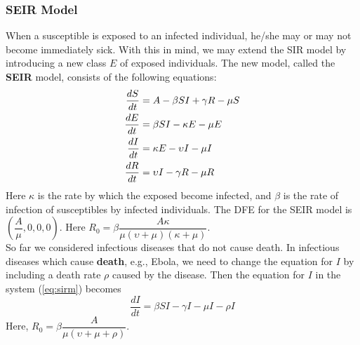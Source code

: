 \subsubsection{SEIR Model}
When a susceptible is exposed to an infected individual, he/she may or may not become immediately sick.
With this in mind, we may extend the SIR model by introducing a new class $E$ of exposed individuals.
The new model, called the \textbf{SEIR} model, consists of the following equations:
\begin{equation}{\label{eq:seirm}}
	\begin{aligned}
		\frac{dS}{dt}&=A-\beta SI+\gamma R-\mu S\\
		\frac{dE}{dt}&=\beta SI-\kappa E-\mu  E\\
		\frac{dI}{dt}&=\kappa E-\upsilon I-\mu I\\
		\frac{dR}{dt}&=\upsilon I-\gamma R-\mu R
	\end{aligned}
\end{equation}
Here $\kappa$ is the rate by which the exposed become infected, and $\beta$ is the rate of infection of susceptibles by infected individuals.
The DFE for the SEIR model is $\left(\dfrac{A}{\mu},0,0,0\right)$.
Here $R_0=\beta\dfrac{A\kappa}{\mu(\upsilon+\mu)(\kappa+\mu)}$.\\
So far we considered infectious diseases that do not cause death.
In infectious diseases which cause \textbf{death}, e.g., Ebola, we need to change the equation for $I$ by including a death rate $\rho$ caused by the disease.
Then the equation for $I$ in the system (\ref{eq:sirm}) becomes
\begin{equation}
	\frac{dI}{dt}=\beta SI-\gamma I-\mu I-\rho I
\end{equation}
Here, $R_0=\beta\dfrac{A}{\mu(\upsilon+\mu+\rho)}$.